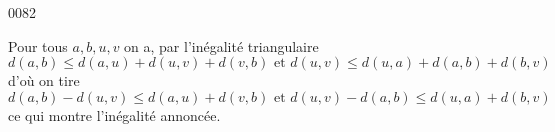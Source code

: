 
\begin{corrige}{0082}

Pour tous $a,b,u,v$ on a, par l'inégalité triangulaire
\[
	d(a,b) \leq d(a,u) + d(u,v) + d(v,b) \text{ et } d(u,v) \leq d(u,a) + d(a,b) + d(b,v)
\]
d'où on tire
\[
	d(a,b) - d(u,v) \leq d(a,u) + d(v,b) \text{ et } d(u,v) - d(a,b) \leq d(u,a) + d(b,v)
\]
ce qui montre l'inégalité annoncée.


\end{corrige}
